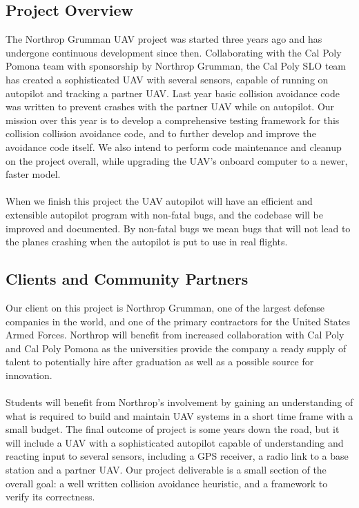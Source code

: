 \documentclass[12pt]{article}
\begin{document}
\subsection{Project Overview}
The Northrop Grumman UAV project was started three years ago and has undergone continuous development since then. Collaborating with the Cal Poly Pomona team with sponsorship by Northrop Grumman, the Cal Poly SLO team has created a sophisticated UAV with several sensors, capable of running on autopilot and tracking a partner UAV. Last year basic collision avoidance code was written to prevent crashes with the partner UAV while on autopilot. Our mission over this year is to develop a comprehensive testing framework for this collision collision avoidance code, and to further develop and improve the avoidance code itself. We also intend to perform code maintenance and cleanup on the project overall, while upgrading the UAV’s onboard computer to a newer, faster model.\\\\
When we finish this project the UAV autopilot will have an efficient and extensible autopilot program with non-fatal bugs, and the codebase will be improved and documented. By non-fatal bugs we mean bugs that will not lead to the planes crashing when the autopilot is put to use in real flights.

\subsection{Clients and Community Partners}
Our client on this project is Northrop Grumman, one of the largest defense companies in the world, and one of the primary contractors for the United States Armed Forces. Northrop will benefit from increased collaboration with Cal Poly and Cal Poly Pomona as the universities provide the company a ready supply of talent to potentially hire after graduation as well as a possible source for innovation.\\\\
Students will benefit from Northrop’s involvement by gaining an understanding of what is required to build and maintain UAV systems in a short time frame with a small budget. The final outcome of project is some years down the road, but it will include a UAV with a sophisticated autopilot capable of understanding and reacting input to several sensors, including a GPS receiver, a radio link to a base station and a partner UAV. Our project deliverable is a small section of the overall goal: a well written collision avoidance heuristic, and a framework to verify its correctness.
\end{document}
